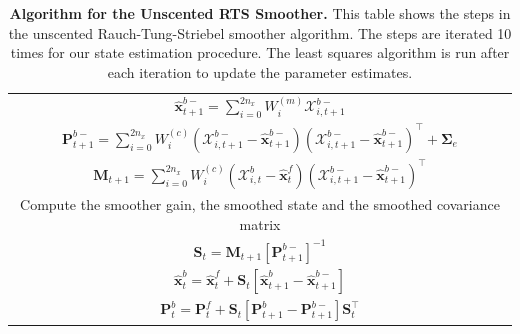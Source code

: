 \documentclass[review,authoryear,3p]{elsarticle}
\begin{document}
\begin{table}[!ht]
\begin{tabular}{|c|}
$\hat{\mathbf x}_{t+1}^{b-}=\sum_{i=0}^{2n_x} W_i^{(m)}\mathcal X_{i,t+1}^{b-}$\\
$\mathbf P_{t +1}^{b-}=\sum_{i=0}^{2n_x} W_i^{(c)}(\mathcal X_{i,t+1}^{b-}-\hat{\mathbf x}_{t +1}^{b-})(\mathcal X_{i,t+1}^{b-}-\hat{\mathbf x}_{t +1}^{b-})^\top+\boldsymbol \Sigma_e $\\
$\mathbf M_{t +1}=\sum_{i=0}^{2n_x} W_i^{(c)}(\mathcal X_{i,t}^{b}-\hat{\mathbf x}_{t}^{f})(\mathcal X_{i,t+1}^{b-}-\hat{\mathbf x}_{t+1}^{b-})^\top$\\
\multicolumn{1}{|p{16cm}|}{Compute the smoother gain, the smoothed state and the smoothed covariance matrix}\\
$\mathbf S_t=\mathbf M_{t +1}\left[ \mathbf P_{t +1}^{b-}\right] ^{-1} $\\
$\hat{\mathbf x}_t^b=\hat{\mathbf x}_t^f+\mathbf S_t\left[\hat{\mathbf x}_{t+1}^{b}-\hat{\mathbf x}_{t+1}^{b-}\right]$\\
$\mathbf P_{t}^{b}=\mathbf P_{t}^{f}+\mathbf S_t\left[\mathbf P_{t+1}^{b}-\mathbf P_{t+1}^{b-} \right]\mathbf S_t^\top $\\
\hline
\end{tabular}
\caption{\textbf{Algorithm for the Unscented RTS Smoother.} This table shows the steps in the unscented Rauch-Tung-Striebel smoother algorithm. The steps are iterated 10 times for our state estimation procedure. The least squares algorithm is run after each iteration to update the parameter estimates.}
\label{tab:UKFAlgorithm}
\end{table}
\renewcommand{\arraystretch}{1}
\end{document}
